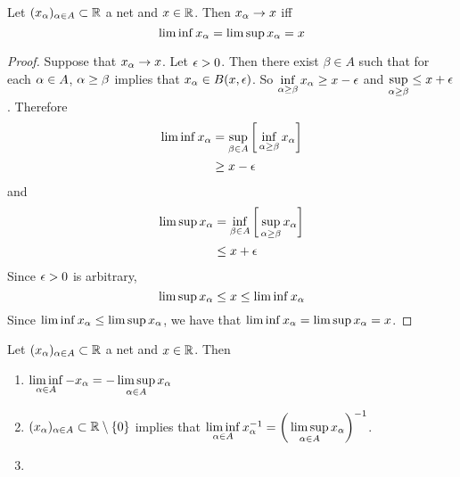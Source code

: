\documentclass{book}
\begin{document}
	\begin{ex}
		Let $(x_{\alpha})_{\alpha \in A} \subset \mathbb{R}$ a net and $x \in \mathbb{R}$. Then $x_{\alpha} \rightarrow x$ iff $$\liminf x_{\alpha} = \limsup x_{\alpha} = x$$
	\end{ex}

	\begin{proof}
		Suppose that $x_{\alpha} \rightarrow x$. Let $\epsilon >0$. Then there exist $\beta \in A$ such that for each $\alpha \in A$, $\alpha \geq \beta$ implies that $x_{\alpha} \in B(x, \epsilon)$. So $\inf\limits_{\alpha \geq \beta} x_{\alpha} \geq x - \epsilon$ and $\sup\limits_{\alpha \geq \beta} \leq x + \epsilon$. Therefore 
		\begin{align*}
			\liminf x_{\alpha} 
			&= \sup_{\beta \in A} \bigg[ \inf_{\alpha \geq \beta} x_{\alpha} \bigg] \\
			& \geq x - \epsilon \\
		\end{align*}
		and 
		\begin{align*}
			\limsup x_{\alpha} 
			&= \inf_{\beta \in A} \bigg[ \sup_{\alpha \geq \beta} x_{\alpha} \bigg] \\
			& \leq x + \epsilon \\
		\end{align*}
		Since $\epsilon >0$ is arbitrary, $$\limsup x_{\alpha} \leq x \leq \liminf x_{\alpha}$$
		Since $\liminf x_{\alpha} \leq \limsup x_{\alpha}$, we have that $\liminf x_{\alpha} = \limsup x_{\alpha} = x$.
	\end{proof}

	\begin{ex}
		Let $(x_{\alpha})_{\alpha \in A} \subset \mathbb{R}$ a net and $x \in \mathbb{R}$. Then
		\begin{enumerate}
			\item $\liminf\limits_{\alpha \in A} -x_{\alpha} = - \limsup\limits_{\alpha \in A} x_{\alpha}$
			\item $(x_{\alpha})_{\alpha \in A} \subset \mathbb{R} \setminus \{0\}$ implies that $\liminf\limits_{\alpha \in A} x_{\alpha}^{-1} = \bigg(\limsup\limits_{\alpha \in A} x_{\alpha} \bigg)^{-1}$.
			\item {}
		\end{enumerate}
	\end{ex}
\end{document}
